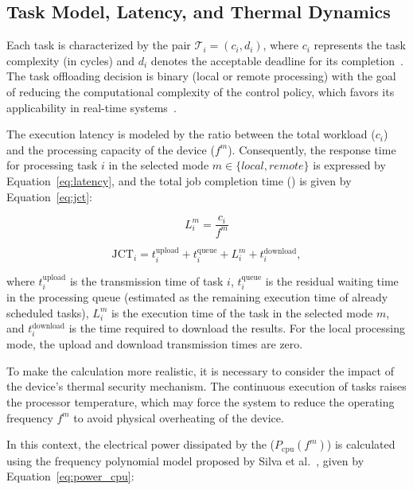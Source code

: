 \subsection{Task Model, Latency, and Thermal Dynamics}

Each task is characterized by the pair $\mathcal{T}_i=(c_i, d_i)$, where $c_i$ represents the task complexity (in  cycles) and $d_i$ denotes the acceptable deadline for its completion~\cite{liu2019, uddin2025, guo2024deep, cao2024survey}. The task offloading decision is binary (local or remote processing) with the goal of reducing the computational complexity of the control policy, which favors its applicability in real-time systems~\cite{liu2019, fofana2024}.

The execution latency is modeled by the ratio between the total workload ($c_i$) and the processing capacity of the device ($f^m$). Consequently, the response time for processing task $i$ in the selected mode $m \in \{local, remote\}$ is expressed by Equation~\ref{eq:latency}, and the total job completion time () is given by Equation~\ref{eq:jct}:

\begin{equation}
\label{eq:latency}
L_i^m = \frac{c_i}{f^m}
\end{equation}

\begin{equation}
\mathrm{JCT}_i = t_i^{\mathrm{upload}} + t_i^{\mathrm{queue}} + L_i^m + t_i^{\mathrm{download}},
\label{eq:jct}
\end{equation}

where $t_i^{\mathrm{upload}}$ is the transmission time of task $i$, $t_i^{\mathrm{queue}}$ is the residual waiting time in the processing queue (estimated as the remaining execution time of already scheduled tasks), $L_i^m$ is the execution time of the task in the selected mode $m$, and $t_i^{\mathrm{download}}$ is the time required to download the results. For the local processing mode, the upload and download transmission times are zero.

To make the  calculation more realistic, it is necessary to consider the impact of the device's thermal security mechanism. The continuous execution of tasks raises the processor temperature, which may force the system to reduce the operating frequency $f^m$ to avoid physical overheating of the device.

In this context, the electrical power dissipated by the  ($P_{\mathrm{cpu}}(f^m)$) is calculated using the frequency polynomial model proposed by Silva et al.~\cite{silva2022analytical}, given by Equation~\ref{eq:power_cpu}:

